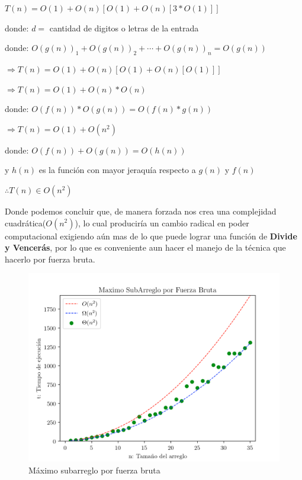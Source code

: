 \documentclass[12pt,twoside]{article}
\begin{document}
\centerline{$T(n) = O(1)+O(n)[O(1) + O(n)[3*O(1)]]$}
\centerline{}
\centerline{donde: $d = $ cantidad de digitos o letras de la entrada}
\centerline{}
\centerline{donde: $O(g(n))_{1} + O(g(n))_{2}+\cdots+O(g(n))_n = O(g(n))$}
\centerline{}
\centerline{$\Rightarrow T(n) = O(1)+O(n)[O(1) + O(n)[O(1)]]$}
\centerline{}
\centerline{$\Rightarrow T(n) = O(1) + O(n)*O(n)$}
\centerline{}
\centerline{donde: $O(f(n)) * O(g(n))= O(f(n)*g(n))$}
\centerline{}
\centerline{$\Rightarrow T(n) = O(1) + O(n^2)$}
\centerline{}
\centerline{donde: $O(f(n)) + O(g(n)) = O(h(n))$}
\centerline{y $h(n)$ es la funci\'on con mayor jeraqu\'ia respecto a $g(n)$ y $f(n)$}
\centerline{}
\centerline{$\therefore T(n) \in O(n^2)$}
\centerline{}
Donde podemos concluir que, de manera forzada nos crea una complejidad cuadrática($O(n^2)$), lo cual produciría un cambio radical en poder 
computacional exigiendo aún mas de lo que puede lograr una función de \textbf{Divide y Vencerás}, por lo que es conveniente aun hacer el manejo 
de la técnica que hacerlo por fuerza bruta. 
\begin{figure}[h]
  \centering
    \includegraphics[height=0.75\textwidth]{Figure4}
  \caption{Máximo subarreglo por fuerza bruta}
  \label{fig:ejemplo3}
\end{figure}
\end{document}
